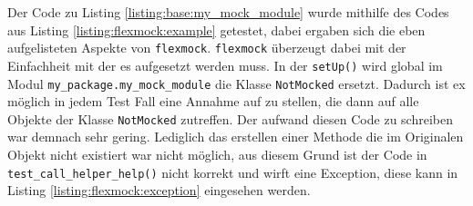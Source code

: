 Der Code zu Listing \ref{listing:base:my_mock_module} wurde mithilfe des Codes aus Listing
\ref{listing:flexmock:example} getestet, dabei ergaben sich die eben aufgelisteten Aspekte von 
\lstinline{flexmock}. \lstinline{flexmock} überzeugt dabei mit der Einfachheit
mit der es aufgesetzt werden muss. In der \lstinline{setUp()} wird global im Modul
\lstinline{my_package.my_mock_module} die Klasse \lstinline{NotMocked} ersetzt. Dadurch ist
ex möglich in jedem Test Fall eine Annahme auf zu stellen, die dann auf alle Objekte
der Klasse \lstinline{NotMocked} zutreffen. Der aufwand diesen Code zu schreiben war demnach
sehr gering. Lediglich das erstellen einer Methode die im Originalen Objekt nicht existiert
war nicht möglich, aus diesem Grund ist der Code in \lstinline{test_call_helper_help()} nicht
korrekt und wirft eine Exception, diese kann in Listing \ref{listing:flexmock:exception}
eingesehen werden.